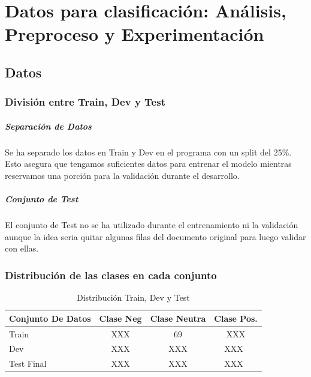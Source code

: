 \documentclass{report}
\begin{document}
    \chapter{Datos para clasificación: Análisis, Preproceso y Experimentación}
        \section{Datos}
            \subsection{División entre Train, Dev y Test}
            \paragraph*{Separación de Datos}{
                Se ha separado los datos en Train y Dev en el programa con un split del 25\%. Esto asegura que tengamos suficientes datos para entrenar el modelo mientras reservamos una porción para la validación durante el desarrollo.
            }
            \paragraph*{Conjunto de Test}{
                El conjunto de Test no se ha utilizado durante el entrenamiento ni la validación aunque la idea seria quitar algunas filas del documento original para luego validar con ellas.
            }

            \subsection{Distribución de las clases en cada conjunto}
            \begin{table}[H]
                \centering
                \begin{tabular}{|l|c|c|c|}
                \hline
                \multicolumn{1}{|c|}{\textbf{Conjunto De Datos}} & \textbf{Clase Neg} & \textbf{Clase Neutra}  & \textbf{Clase Pos.}  \\ \hline
                Train & {XXX} & {69} & {XXX}\\ \hline
                Dev & {XXX} & {XXX} & {XXX}\                  \\ \hline
                Test Final & {XXX} & {XXX} & {XXX}\                  \\ \hline
                \end{tabular}
                \caption{Distribución Train, Dev y Test}
                \label{tab:costes}
                \end{table}
\end{document}
